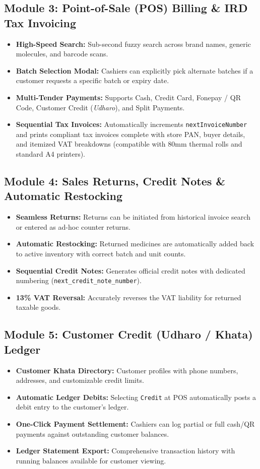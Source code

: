 \documentclass[10pt,a4paper]{article}
\begin{document}
\subsection{Module 3: Point-of-Sale (POS) Billing \& IRD Tax Invoicing}
\begin{itemize}
    \item \textbf{High-Speed Search:} Sub-second fuzzy search across brand names, generic molecules, and barcode scans.
    \item \textbf{Batch Selection Modal:} Cashiers can explicitly pick alternate batches if a customer requests a specific batch or expiry date.
    \item \textbf{Multi-Tender Payments:} Supports Cash, Credit Card, Fonepay / QR Code, Customer Credit (\textit{Udharo}), and Split Payments.
    \item \textbf{Sequential Tax Invoices:} Automatically increments \texttt{nextInvoiceNumber} and prints compliant tax invoices complete with store PAN, buyer details, and itemized VAT breakdowns (compatible with 80mm thermal rolls and standard A4 printers).
\end{itemize}

\subsection{Module 4: Sales Returns, Credit Notes \& Automatic Restocking}
\begin{itemize}
    \item \textbf{Seamless Returns:} Returns can be initiated from historical invoice search or entered as ad-hoc counter returns.
    \item \textbf{Automatic Restocking:} Returned medicines are automatically added back to active inventory with correct batch and unit counts.
    \item \textbf{Sequential Credit Notes:} Generates official credit notes with dedicated numbering (\texttt{next\_credit\_note\_number}).
    \item \textbf{13\% VAT Reversal:} Accurately reverses the VAT liability for returned taxable goods.
\end{itemize}

\subsection{Module 5: Customer Credit (Udharo / Khata) Ledger}
\begin{itemize}
    \item \textbf{Customer Khata Directory:} Customer profiles with phone numbers, addresses, and customizable credit limits.
    \item \textbf{Automatic Ledger Debits:} Selecting \texttt{Credit} at POS automatically posts a debit entry to the customer's ledger.
    \item \textbf{One-Click Payment Settlement:} Cashiers can log partial or full cash/QR payments against outstanding customer balances.
    \item \textbf{Ledger Statement Export:} Comprehensive transaction history with running balances available for customer viewing.
\end{itemize}
\end{document}

